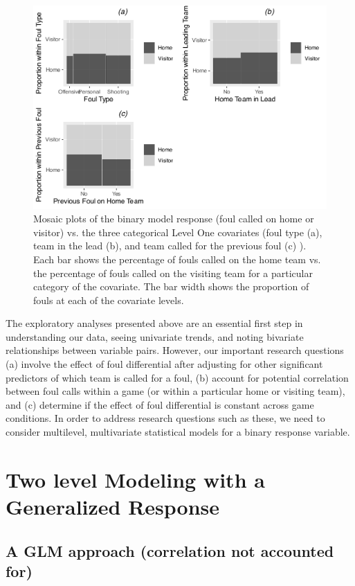 \documentclass[
]{krantz}
\begin{document}
\begin{figure}

{\centering \includegraphics[width=0.6\linewidth]{bookdown-BeyondMLR_files/figure-latex/gmu-barmat1-1} 

}

\caption{Mosaic plots of the binary model response (foul called on home or visitor) vs. the three categorical Level One covariates (foul type (a), team in the lead (b), and team called for the previous foul (c) ).  Each bar shows the percentage of fouls called on the home team vs. the percentage of fouls called on the visiting team for a particular category of the covariate.  The bar width shows the proportion of fouls at each of the covariate levels.}\label{fig:gmu-barmat1}
\end{figure}

The exploratory analyses presented above are an essential first step in understanding our data, seeing univariate trends, and noting bivariate relationships between variable pairs. However, our important research questions (a) involve the effect of foul differential after adjusting for other significant predictors of which team is called for a foul, (b) account for potential correlation between foul calls within a game (or within a particular home or visiting team), and (c) determine if the effect of foul differential is constant across game conditions. In order to address research questions such as these, we need to consider multilevel, multivariate statistical models for a binary response variable.

\hypertarget{twolevelmodeling-glmm}{%
\section{Two level Modeling with a Generalized Response}\label{twolevelmodeling-glmm}}

\hypertarget{multregr-glmm}{%
\subsection{A GLM approach (correlation not accounted for)}\label{multregr-glmm}}
\end{document}
